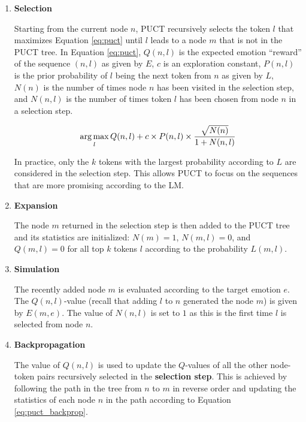 \begin{enumerate}
    \item \textbf{Selection}

    Starting from the current node $n$, PUCT recursively selects the token $l$ that maximizes Equation \ref{eq:puct} until $l$ leads to a node $m$ that is not in the PUCT tree. In Equation \ref{eq:puct}, $Q(n, l)$ is the expected emotion ``reward'' of the sequence $(n, l)$ as given by $E$, $c$ is an exploration constant, $P(n, l)$ is the prior probability of $l$ being the next token from $n$ as given by $L$, $N(n)$ is the number of times node $n$ has been visited in the selection step, and $N(n, l)$ is the number of times token $l$ has been chosen from node $n$ in a selection step.

    \begin{equation}
    \operatorname*{arg\,max}_{l} Q(n, l) + c \times P(n, l) \times \frac{\sqrt{N(n)}}{1 + N(n, l)}
    \label{eq:puct}
    \end{equation}

    In practice, only the $k$ tokens with the largest probability according to $L$ are considered in the selection step. This allows PUCT to focus on the sequences that are more promising according to the LM.

    \item \textbf{Expansion}

    The node $m$ returned in the selection step is then added to the PUCT tree and its statistics are initialized: $N(m) = 1$, $N(m, l) = 0$, and $Q(m, l) = 0$ for all top $k$ tokens $l$ according to the probability $L(m, l)$.

    \item \textbf{Simulation}

    The recently added node $m$ is evaluated according to the target emotion $e$. The $Q(n, l)$-value (recall that adding $l$ to $n$ generated the node $m$) is given by $E(m, e)$. The value of $N(n, l)$ is set to $1$ as this is the first time $l$ is selected from node $n$.

    \item \textbf{Backpropagation}

    The value of $Q(n, l)$ is used to update the $Q$-values of all the other node-token pairs recursively selected in the \textbf{selection step}. This is achieved by following the path in the tree from $n$ to $m$ in reverse order and updating the statistics of each node $n$ in the path according to Equation \ref{eq:puct_backprop}.


\end{enumerate}
